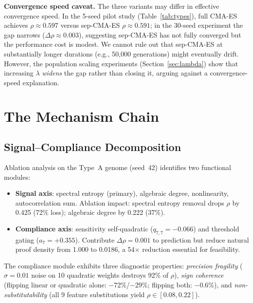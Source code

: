\documentclass[twoside,11pt]{article}
\begin{document}
\textbf{Convergence speed caveat.} The three variants may differ in effective
convergence speed. In the 5-seed pilot study (Table~\ref{tab:types}),
full CMA-ES achieves $\rho \approx 0.597$ versus sep-CMA-ES
$\rho \approx 0.591$; in the 30-seed experiment the gap narrows
($\Delta\rho \approx 0.003$), suggesting sep-CMA-ES has not fully
converged but the performance cost is modest. We cannot
rule out that sep-CMA-ES at substantially longer durations (e.g., 50{,}000
generations) might eventually drift. However, the population scaling experiments
(Section~\ref{sec:lambda}) show that increasing $\lambda$ \emph{widens} the
gap rather than closing it, arguing against a convergence-speed explanation.

\section{The Mechanism Chain}
\label{sec:mechanism}

\subsection{Signal--Compliance Decomposition}

Ablation analysis on the Type~A genome (seed~42) identifies two functional modules:

\begin{itemize}
\item \textbf{Signal axis}: spectral entropy (primary), algebraic degree,
  nonlinearity, autocorrelation sum. Ablation impact: spectral entropy removal
  drops $\rho$ by 0.425 (72\% loss); algebraic degree by 0.222 (37\%).

\item \textbf{Compliance axis}: sensitivity self-quadratic ($q_{7,7} = -0.066$)
  and threshold gating ($a_7 = +0.355$). Contribute $\Delta\rho = 0.001$ to
  prediction but reduce natural proof density from 1.000 to 0.0186, a
  54$\times$ reduction essential for feasibility.
\end{itemize}

The compliance module exhibits three diagnostic properties: \emph{precision
fragility} ($\sigma = 0.01$ noise on 10 quadratic weights destroys 92\% of
$\rho$), \emph{sign coherence} (flipping linear or quadratic alone:
$-$72\%/$-$29\%; flipping both: $-$0.6\%), and \emph{non-substitutability}
(all 9 feature substitutions yield $\rho \in [0.08, 0.22]$).
\end{document}
